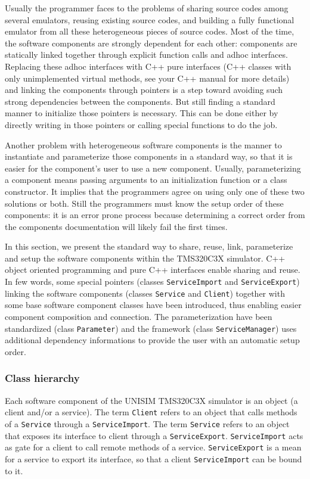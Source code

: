 Usually the programmer faces to the problems of sharing source codes among several emulators, reusing existing source codes, and building a fully functional emulator from all these heterogeneous pieces of source codes.
Most of the time, the software components are strongly dependent for each other: components are statically linked together through explicit function calls and adhoc interfaces.
Replacing these adhoc interfaces with C++ pure interfaces (C++ classes with only unimplemented virtual methods, see your C++ manual for more details) and linking the components through pointers is a step toward avoiding such strong dependencies between the components. But still finding a standard manner to initialize those pointers is necessary. This can be done either by directly writing in those pointers or calling special functions to do the job.

Another problem with heterogeneous software components is the manner to instantiate and parameterize those components in a standard way, so that it is easier for the component's user to use a new component.
Usually, parameterizing a component means passing arguments to an initialization function or a class constructor. It implies that the programmers agree on using only one of these two solutions or both.
Still the programmers must know the setup order of these components: it is an error prone process because determining a correct order from the components documentation will likely fail the first times.

In this section, we present the standard way to share, reuse, link, parameterize and setup the software components within the TMS320C3X simulator.
C++ object oriented programming and pure C++ interfaces enable sharing and reuse.
In few words, some special pointers (classes \texttt{ServiceImport} and \texttt{ServiceExport}) linking the software components (classes \texttt{Service} and \texttt{Client}) together with some base software component classes have been introduced, thus enabling easier component composition and connection.
The parameterization have been standardized (class \texttt{Parameter}) and the framework (class \texttt{ServiceManager}) uses additional dependency informations to provide the user with an automatic setup order.

\subsubsection{Class hierarchy}

Each software component of the UNISIM TMS320C3X simulator is an object (a client and/or a service). The term \texttt{Client} refers to an object that calls methods of a \texttt{Service} through a \texttt{ServiceImport}. The term \texttt{Service} refers to an object that exposes its interface to client through a \texttt{ServiceExport}. \texttt{ServiceImport} acts as gate for a client to call remote methods of a service. \texttt{ServiceExport} is a mean for a service to export its interface, so that a client \texttt{ServiceImport} can be bound to it.

